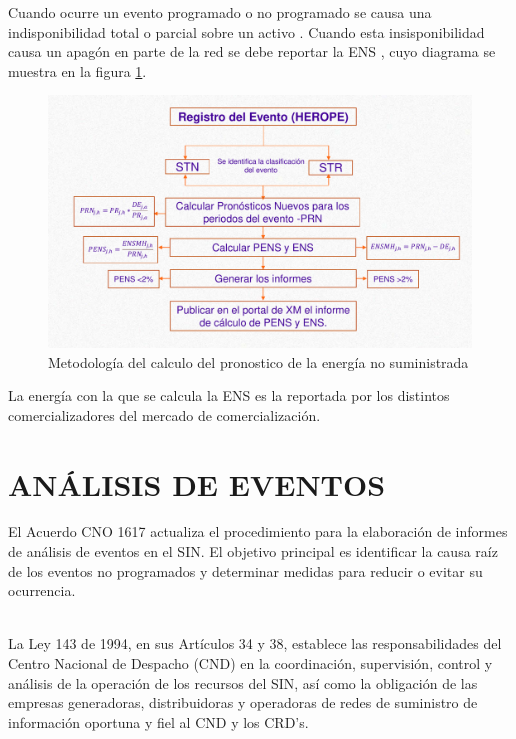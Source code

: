 \documentclass[a5paper]{book}%
\begin{document}
Cuando ocurre un evento programado o no programado se causa una
indisponibilidad total o parcial  sobre un activo \cite{CREG0942012}. Cuando esta
insisponibilidad causa un apagón en parte de la red se debe reportar la
 \ac{ENS} \cite{CREG0152018}, cuyo diagrama se muestra en la figura \ref{fig:ens}.

\begin{figure}[H]
  \centering
  \caption{Metodología del calculo del pronostico de la energía no
    suministrada}
  \label{fig:ens}
  \includegraphics[width=\linewidth]{calculo_ens.png}
\end{figure}


La energía con la que se calcula la \ac{ENS} es la reportada por los
distintos comercializadores del mercado de comercialización.

  \section{ANÁLISIS DE EVENTOS}

El Acuerdo CNO 1617 actualiza el procedimiento para la elaboración de informes de análisis de eventos en el \ac{SIN}. El objetivo principal es identificar la causa raíz de los eventos no programados y determinar medidas para reducir o evitar su ocurrencia.\\\\

\begin{center}
\begin{tcolorbox}
La Ley 143 de 1994, en sus Artículos 34 y 38, establece las responsabilidades del Centro Nacional de Despacho (CND) en la coordinación, supervisión, control y análisis de la operación de los recursos del SIN, así como la obligación de las empresas generadoras, distribuidoras y operadoras de redes de suministro de información oportuna y fiel al CND y los CRD's.
\end{tcolorbox}
\end{center}
\end{document}

